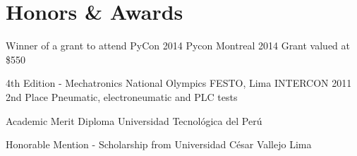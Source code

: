 \section{Honors \& Awards}

{Winner of a grant to attend PyCon 2014}
{Pycon}
{Montreal 2014}
{}
{Grant valued at \$550}

{4th Edition - Mechatronics National Olympics}
{FESTO, Lima}
{INTERCON 2011}
{2nd Place}
{Pneumatic, electroneumatic and PLC tests}  

{Academic Merit Diploma}
{Universidad Tecnológica del Perú}{}{}
{}  

{Honorable Mention - Scholarship from Universidad César Vallejo}
{Lima}
{}{}
{}  